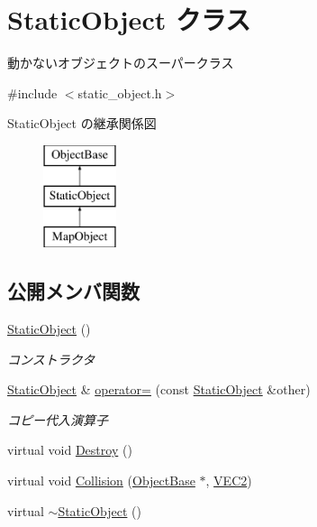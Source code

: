 \hypertarget{class_static_object}{}\section{Static\+Object クラス}
\label{class_static_object}


動かないオブジェクトのスーパークラス  




{\ttfamily \#include $<$static\+\_\+object.\+h$>$}

Static\+Object の継承関係図\begin{figure}[H]
\begin{center}
\leavevmode
\includegraphics[height=3.000000cm]{class_static_object}
\end{center}
\end{figure}
\subsection*{公開メンバ関数}
\begin{DoxyCompactItemize}
\item 
\mbox{\hyperlink{class_static_object_a2a8e918ddfe5c6723b88b9f5c4156472}{Static\+Object}} ()
\begin{DoxyCompactList}\small\item\em コンストラクタ \end{DoxyCompactList}\item 
\mbox{\hyperlink{class_static_object}{Static\+Object}} \& \mbox{\hyperlink{class_static_object_aa2a0526bd19e479ea4d1e5da236c1bf3}{operator=}} (const \mbox{\hyperlink{class_static_object}{Static\+Object}} \&other)
\begin{DoxyCompactList}\small\item\em コピー代入演算子 \end{DoxyCompactList}\item 
virtual void \mbox{\hyperlink{class_static_object_a8e9fb321b4f8f12c4bec1bc66853512f}{Destroy}} ()
\item 
virtual void \mbox{\hyperlink{class_static_object_abe05f711f0d62319e1a11419813c5d50}{Collision}} (\mbox{\hyperlink{class_object_base}{Object\+Base}} $\ast$, \mbox{\hyperlink{common_8h_afb0c5e21d4133ff4f200992c0b534e1b}{V\+E\+C2}})
\item 
virtual \mbox{\hyperlink{class_static_object_ac27301fc3d8d22aff5664f592c375cd8}{$\sim$\+Static\+Object}} ()
\end{DoxyCompactItemize}
